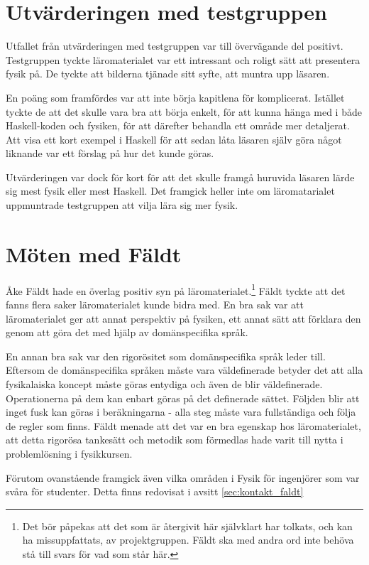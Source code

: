 \begin{draft}
%
%
%

\section{Utvärderingen med testgruppen}

Utfallet från utvärderingen med testgruppen var till övervägande del positivt. Testgruppen tyckte läromaterialet var ett intressant och roligt sätt att presentera fysik på. De tyckte att bilderna tjänade sitt syfte, att muntra upp läsaren. 

En poäng som framfördes var att inte börja kapitlena för komplicerat. Istället tyckte de att det skulle vara bra att börja enkelt, för att kunna hänga med i både Haskell-koden och fysiken, för att därefter behandla ett område mer detaljerat. Att visa ett kort exempel i Haskell för att sedan låta läsaren själv göra något liknande var ett förslag på hur det kunde göras.

Utvärderingen var dock för kort för att det skulle framgå huruvida läsaren lärde sig mest fysik eller mest Haskell. Det framgick heller inte om läromatarialet uppmuntrade testgruppen att vilja lära sig mer fysik.

\section{Möten med Fäldt}

Åke Fäldt hade en överlag positiv syn på läromaterialet.\footnote{Det bör påpekas att det som är återgivit här självklart har tolkats, och kan ha missuppfattats, av projektgruppen. Fäldt ska med andra ord inte behöva stå till svars för vad som står här.} Fäldt tyckte att det fanns flera saker läromaterialet kunde bidra med. En bra sak var att läromaterialet ger att annat perspektiv på fysiken, ett annat sätt att förklara den genom att göra det med hjälp av domänspecifika språk.

En annan bra sak var den rigorösitet som domänspecifika språk leder till. Eftersom de domänspecifika språken måste vara väldefinerade betyder det att alla fysikalaiska koncept måste göras entydiga och även de blir väldefinerade. Operationerna på dem kan enbart göras på det definerade sättet. Följden blir att inget fusk kan göras i beräkningarna - alla steg måste vara fullständiga och följa de regler som finns. Fäldt menade att det var en bra egenskap hos läromaterialet, att detta rigorösa tankesätt och metodik som förmedlas hade varit till nytta i problemlösning i fysikkursen.

Förutom ovanstående framgick även vilka områden i Fysik för ingenjörer som var svåra för studenter. Detta finns redovisat i avsitt \ref{sec:kontakt_faldt}

\end{draft}
